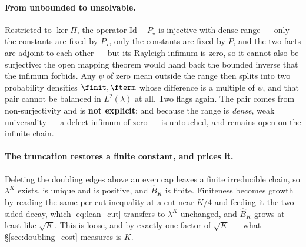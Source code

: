 \paragraph{From unbounded to unsolvable.}
Restricted to $\ker\Pi$, the operator $\mathrm{Id}-P_\star$ is injective with dense range ---
only the constants are fixed by $P_\star$, only the constants are fixed by $P$, and the two
facts are adjoint to each other --- but its Rayleigh infimum is zero, so it cannot also be
surjective: the open mapping theorem would hand back the bounded inverse that the infimum
forbids. Any $\psi$ of zero mean outside the range then splits into two probability densities
$\finit,\fterm$ whose difference is a multiple of $\psi$, and that pair cannot be balanced in
$L^2(\lambda)$ at all. Two flags again. The pair comes from non-surjectivity and is
\textbf{not explicit}; and because the range is \emph{dense}, weak universality --- a defect
infimum of zero --- is untouched, and remains open on the infinite chain.

\paragraph{The truncation restores a finite constant, and prices it.}
Deleting the doubling edges above an even cap leaves a finite irreducible chain, so $\lambda^K$
exists, is unique and is positive, and $\widehat B_K$ is finite. Finiteness becomes growth by
reading the same per-cut inequality at a cut near $K/4$ and feeding it the two-sided decay,
which \eqref{eq:lean_cut} transfers to $\lambda^K$ unchanged, and $\widehat B_K$ grows at
least like $\sqrt K$.
This is loose, and by exactly one factor of $\sqrt K$ --- what \S\ref{sec:doubling_cost}
measures is $K$.

